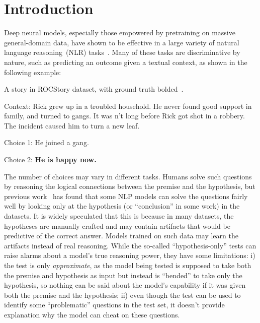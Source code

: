 \section{Introduction}
\label{sec:intro}
Deep neural models, especially those empowered by pretraining on massive
general-domain data, have shown to be effective in 
a large variety of natural language reasoning~(NLR)
tasks~\cite{bowman2015large,wang2018glue,mostafazadeh2016corpus,roemmele2011choice,zellers2018swag}. 
Many of these tasks are discriminative by nature, such as predicting 
an outcome given a textual context, as shown in the following example:
\begin{example}\label{exp:roc}
A story in ROCStory dataset, with ground truth bolded~\cite{mostafazadeh2016corpus}.
\begin{description}
\item{Context:} Rick grew up in a troubled household.
He never found good support in family, and turned to gangs.
It was n't long before Rick got shot in a robbery.
The incident caused him to turn a new leaf.
\item{Choice 1:} He joined a gang.
\item{Choice 2:}  \textbf{He is happy now.}
\end{description}
\end{example}

The number of choices may vary in different tasks. 
Humans solve such questions by reasoning the logical connections 
between the premise and the hypothesis,
but previous work~\cite{naik2018stress,schuster2019towards} 
has found that some NLP models can solve the questions
fairly well by looking only at the hypothesis (or ``conclusion'' in some work)
in the datasets.
It is widely speculated that this is because in many datasets, 
the hypotheses are manually crafted and may contain artifacts that
would be predictive of the correct answer. Models trained on
such data may learn the artifacts instead of real reasoning. 
While the so-called ``hypothesis-only'' tests can raise alarms about a
model's true reasoning power, they have some limitations: 
i) the test is only \textit{approximate}, as the model being tested 
is supposed to take both the premise and hypothesis as input
but instead is ``bended'' to take only the hypothesis, 
so nothing can be said about the model's capability if it was 
given both the premise and the hypothesis;
ii) even though the test can be used to identify some ``problematic''
questions in the test set, it doesn't provide explanation why the model
can cheat on these questions.

